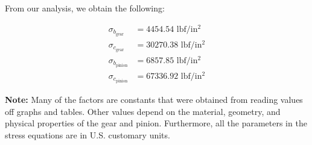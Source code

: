 \documentclass[letterpaper,12pt]{article}
\begin{document}
\noindent From our analysis, we obtain the following: 

\begin{align*}
    \sigma_{b_{\text{gear}}} &= 4454.54 \text{ lbf/in$^2$} \\
    \sigma_{c_{\text{gear}}} &= 30270.38 \text{ lbf/in$^2$} \\
    \sigma_{b_{\text{pinion}}} &= 6857.85 \text{ lbf/in$^2$} \\
    \sigma_{c_{\text{pinion}}} &= 67336.92 \text{ lbf/in$^2$} 
\end{align*}

\noindent\textbf{Note:} Many of the factors are constants that were obtained from reading values off graphs and tables. Other values depend on the material, geometry, and physical properties of the gear and pinion. Furthermore, all the parameters in the stress equations are in U.S. customary units. \\
\end{document}
